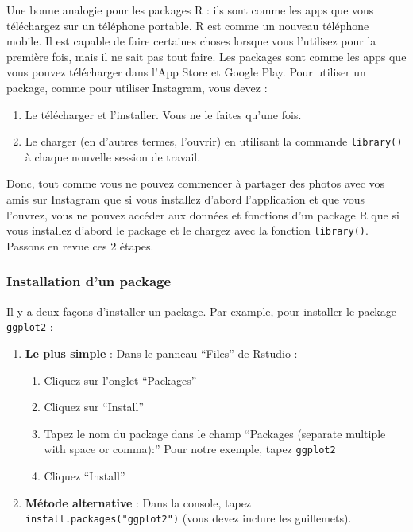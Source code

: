 \documentclass[a4paperpaper,]{article}
\providecommand{\tightlist}{%
  \setlength{\itemsep}{0pt}\setlength{\parskip}{0pt}}
\begin{document}
Une bonne analogie pour les packages R : ils sont comme les apps que vous téléchargez sur un téléphone portable. R est comme un nouveau téléphone mobile. Il est capable de faire certaines choses lorsque vous l'utilisez pour la première fois, mais il ne sait pas tout faire. Les packages sont comme les apps que vous pouvez télécharger dans l'App Store et Google Play. Pour utiliser un package, comme pour utiliser Instagram, vous devez :

\begin{enumerate}
\def\labelenumi{\arabic{enumi}.}
\tightlist
\item
  Le télécharger et l'installer. Vous ne le faites qu'une fois.
\item
  Le charger (en d'autres termes, l'ouvrir) en utilisant la commande \texttt{library()} à chaque nouvelle session de travail.
\end{enumerate}

Donc, tout comme vous ne pouvez commencer à partager des photos avec vos amis sur Instagram que si vous installez d'abord l'application et que vous l'ouvrez, vous ne pouvez accéder aux données et fonctions d'un package R que si vous installez d'abord le package et le chargez avec la fonction \texttt{library()}. Passons en revue ces 2 étapes.

\hypertarget{installation-dun-package}{%
\subsubsection{Installation d'un package}\label{installation-dun-package}}

Il y a deux façons d'installer un package. Par example, pour installer le package \texttt{ggplot2} :

\begin{enumerate}
\def\labelenumi{\arabic{enumi}.}
\tightlist
\item
  \textbf{Le plus simple} : Dans le panneau ``Files'' de Rstudio :

  \begin{enumerate}
  \def\labelenumii{\alph{enumii})}
  \tightlist
  \item
    Cliquez sur l'onglet ``Packages''
  \item
    Cliquez sur ``Install''
  \item
    Tapez le nom du package dans le champ ``Packages (separate multiple with space or comma):'' Pour notre exemple, tapez \texttt{ggplot2}
  \item
    Cliquez ``Install''
  \end{enumerate}
\item
  \textbf{Métode alternative} : Dans la console, tapez \texttt{install.packages("ggplot2")} (vous devez inclure les guillemets).
\end{enumerate}
\end{document}
